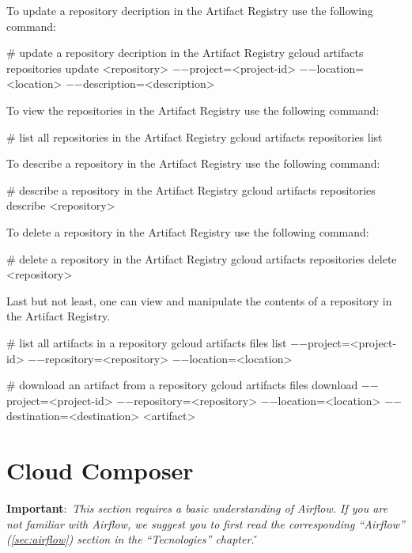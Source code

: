 To update a repository decription in the Artifact Registry use the following command:
\begin{bash}
# update a repository decription in the Artifact Registry
gcloud artifacts repositories update <repository>
    $-$$-$project=<project-id>
    $-$$-$location=<location>
    $-$$-$description=<description>
\end{bash}

To view the repositories in the Artifact Registry use the following command:
\begin{bash}
# list all repositories in the Artifact Registry
gcloud artifacts repositories list
\end{bash}

To describe a repository in the Artifact Registry use the following command:
\begin{bash}
# describe a repository in the Artifact Registry
gcloud artifacts repositories describe <repository>
\end{bash}

To delete a repository in the Artifact Registry use the following command:
\begin{bash}
# delete a repository in the Artifact Registry
gcloud artifacts repositories delete <repository>
\end{bash}

Last but not least, one can view and manipulate the contents of a repository in the Artifact Registry.

\begin{bash}
# list all artifacts in a repository
gcloud artifacts files list
    $-$$-$project=<project-id>
    $-$$-$repository=<repository>
    $-$$-$location=<location>
\end{bash}

\begin{bash}
# download an artifact from a repository
gcloud artifacts files download
    $-$$-$project=<project-id>
    $-$$-$repository=<repository>
    $-$$-$location=<location>
    $-$$-$destination=<destination>
    <artifact>
\end{bash}

\section{Cloud Composer}

\textbf{Important}:~\textit{This section requires a basic understanding of Airflow. If you are not familiar with
Airflow, we suggest you to first read the corresponding ``Airflow'' (\ref{sec:airflow}) section in the ``Tecnologies''
chapter.} \v

